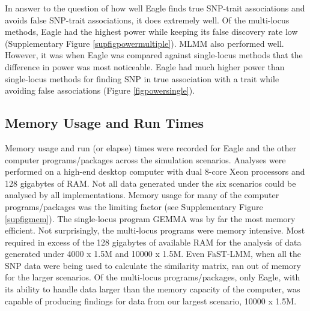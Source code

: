 \documentclass{article}
\begin{document}
In answer to the question of how well Eagle finds true SNP-trait associations and avoids false SNP-trait associations, it does extremely 
well.  Of the multi-locus methods, Eagle had the highest power
while keeping its false discovery rate low (Supplementary Figure \ref{supfigpowermultiple}). MLMM also performed well. However, it was when Eagle was compared against single-locus methods 
that the difference in power was most noticeable.  Eagle had much higher power than single-locus methods for finding SNP in true 
association with a trait while avoiding false associations (Figure \ref{figpowersingle}). 





\subsection{Memory Usage and Run Times}

Memory usage and run (or elapse) times were recorded for Eagle and the other computer programs/packages across the simulation scenarios. 
Analyses were performed on a high-end desktop computer with dual 8-core Xeon processors and 128 gigabytes of RAM. Not all data generated under the six scenarios could be analysed by all implementations. Memory usage 
for many of the computer programs/packages was the limiting factor (see Supplementary Figure \ref{supfigmem}).  The single-locus program GEMMA was by 
far the most memory efficient. Not surprisingly, the multi-locus programs were memory intensive. Most required in 
excess of the 128 gigabytes of available RAM for the analysis of data generated under 4000 x 1.5M and 10000 x 1.5M.  
Even FaST-LMM, when all the SNP data were being used to calculate the similarity matrix, ran out of memory for the larger scenarios.
Of the multi-locus programs/packages, only Eagle,  
with its ability to handle data larger than the memory capacity of the computer, was capable of producing findings 
for data from our largest scenario, 10000 x 1.5M. 
\end{document}
